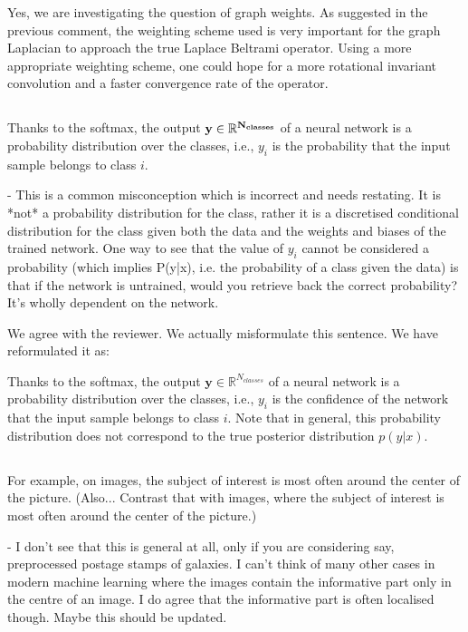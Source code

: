 \documentclass[12pt,a4paper]{article}
\newcommand{\nati}[1]{{\color[rgb]{.1,.6,.1}{NP: #1}}}
\newcommand{\todo}[1]{{\color[rgb]{.6,.1,.6}{TODO: #1}}}
\renewcommand{\b}[1]{{\bm{#1}}}   %
\newcommand{\1}{\b{1}}              %
\newcommand{\0}{\b{0}}              %
\newcommand{\y}{\b{y}}
\newcommand{\R}{\mathbb{R}}
\begin{document}
Yes, we are investigating the question of graph weights.
As suggested in the previous comment, the weighting scheme used is very important for the graph Laplacian to approach the true Laplace Beltrami operator. Using a more appropriate weighting scheme, one could hope for a more rotational invariant convolution and a faster convergence rate of the operator.
\nati{@michael, how much shall we say here?}

\subsection{}
\begin{mdframed}[style=comment]
Thanks to the softmax, the output $\bf{y}\in\mathbb{R}^{N_{classes}}$ of a neural network is a probability distribution over the classes, i.e., $y_i$ is the probability that the input sample belongs to class $i$.

- This is a common misconception which is incorrect and needs restating. It is *not* a probability distribution for the class, rather it is a discretised conditional distribution for the class given both the data and the weights and biases of the trained network. One way to see that the value of $y_i$ cannot be considered a probability (which implies P(y|x), i.e. the probability of a class given the data) is that if the network is untrained, would you retrieve back the correct probability? It's wholly dependent on the network.
\end{mdframed}

We agree with the reviewer. We actually misformulate this sentence. We have reformulated it as:
\begin{mdframed}[style=manuscript]
Thanks to the softmax, the output $\y \in \R^{N_{classes}}$ of a neural network is a probability distribution over the classes, i.e., $y_i$ is the confidence of the network that the input sample belongs to class $i$. Note that in general, this probability distribution does not correspond to the true posterior distribution $p(y|x)$.
\end{mdframed}

\nati{By the way, this mean that the reviewer is knowledgable with ML, and may be Bayesian. He might be working on another spherical approach.}

\subsection{}
\begin{mdframed}[style=comment]
For example, on images, the subject of interest is most often around the center of the picture. (Also... Contrast that with images, where the subject of interest is most often around the center of the picture.)

- I don't see that this is general at all, only if you are considering say, preprocessed postage stamps of galaxies. I can't think of many other cases in modern machine learning where the images contain the informative part only in the centre of an image. I do agree that the informative part is often localised though. Maybe this should be updated.
\end{mdframed}
\todo{Assigned: @michael}
\end{document}
